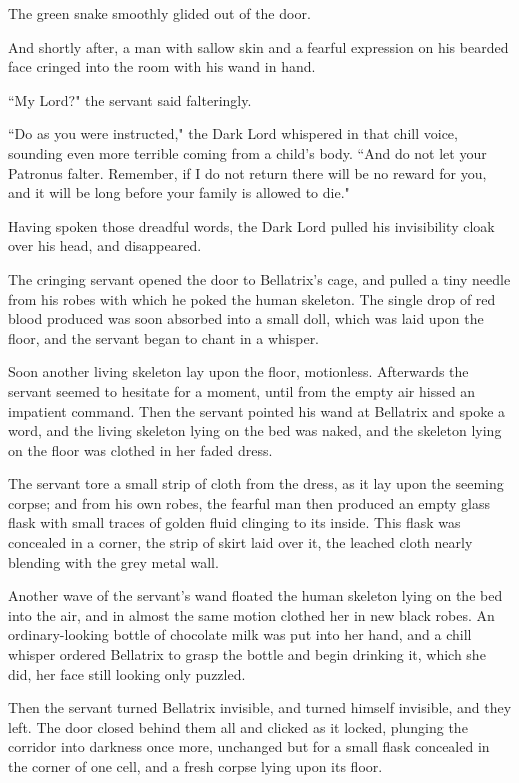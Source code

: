 The green snake smoothly glided out of the door.

And shortly after, a man with sallow skin and a fearful expression on his bearded face cringed into the room with his wand in hand.

``My Lord?" the servant said falteringly.

``Do as you were instructed," the Dark Lord whispered in that chill voice, sounding even more terrible coming from a child's body. ``And do not let your Patronus falter. Remember, if I do not return there will be no reward for you, and it will be long before your family is allowed to die."

Having spoken those dreadful words, the Dark Lord pulled his invisibility cloak over his head, and disappeared.

The cringing servant opened the door to Bellatrix's cage, and pulled a tiny needle from his robes with which he poked the human skeleton. The single drop of red blood produced was soon absorbed into a small doll, which was laid upon the floor, and the servant began to chant in a whisper.

Soon another living skeleton lay upon the floor, motionless. Afterwards the servant seemed to hesitate for a moment, until from the empty air hissed an impatient command. Then the servant pointed his wand at Bellatrix and spoke a word, and the living skeleton lying on the bed was naked, and the skeleton lying on the floor was clothed in her faded dress.

The servant tore a small strip of cloth from the dress, as it lay upon the seeming corpse; and from his own robes, the fearful man then produced an empty glass flask with small traces of golden fluid clinging to its inside. This flask was concealed in a corner, the strip of skirt laid over it, the leached cloth nearly blending with the grey metal wall.

Another wave of the servant's wand floated the human skeleton lying on the bed into the air, and in almost the same motion clothed her in new black robes. An ordinary-looking bottle of chocolate milk was put into her hand, and a chill whisper ordered Bellatrix to grasp the bottle and begin drinking it, which she did, her face still looking only puzzled.

Then the servant turned Bellatrix invisible, and turned himself invisible, and they left. The door closed behind them all and clicked as it locked, plunging the corridor into darkness once more, unchanged but for a small flask concealed in the corner of one cell, and a fresh corpse lying upon its floor.

